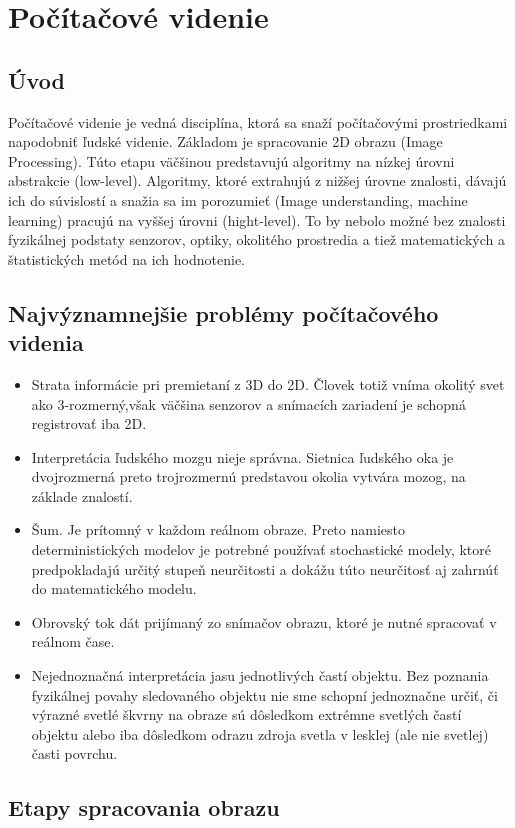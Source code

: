 \chapter{Počítačové videnie}
\section{Úvod}
Počítačové videnie je vedná disciplína, ktorá sa snaží počítačovými prostriedkami napodobniť ľudské videnie. Základom je spracovanie 2D obrazu (Image Processing). Túto etapu väčšinou predstavujú algoritmy na nízkej úrovni abstrakcie (low-level). Algoritmy, ktoré extrahujú z nižšej úrovne znalosti, dávajú ich do súvislostí a snažia sa im porozumieť (Image understanding, machine learning) pracujú na vyššej úrovni (hight-level). To by nebolo možné bez znalosti fyzikálnej podstaty senzorov, optiky, okolitého prostredia a tiež matematických a štatistických metód na ich hodnotenie.

\section{Najvýznamnejšie problémy počítačového videnia}
\begin{itemize}
\item Strata informácie pri premietaní z 3D do 2D. Človek totiž vníma okolitý svet ako 3-rozmerný,však väčšina senzorov a snímacích zariadení je schopná registrovať iba 2D.
\item Interpretácia ľudského mozgu nieje správna. Sietnica ľudského oka je dvojrozmerná preto trojrozmernú predstavou okolia vytvára mozog, na základe znalostí.
\item Šum. Je prítomný v každom reálnom obraze. Preto namiesto deterministických modelov je potrebné používať stochastické modely, ktoré predpokladajú určitý stupeň neurčitosti a dokážu túto neurčitosť aj zahrnúť do matematického modelu.
\item Obrovský tok dát prijímaný zo snímačov obrazu, ktoré je nutné spracovať v reálnom čase.
\item Nejednoznačná interpretácia jasu jednotlivých častí objektu. Bez poznania fyzikálnej povahy sledovaného objektu nie sme schopní jednoznačne určiť, či výrazné svetlé škvrny na obraze sú dôsledkom extrémne svetlých častí objektu alebo iba dôsledkom odrazu zdroja svetla v lesklej (ale nie svetlej) časti povrchu.
\end{itemize}


\section{Etapy spracovania obrazu}

